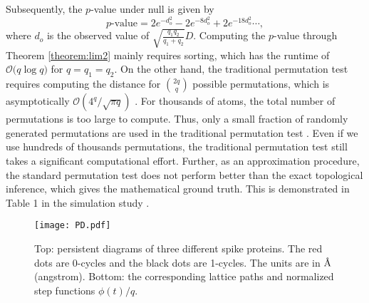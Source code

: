 \documentclass{llncs}
\begin{document}
Subsequently, the $p$-value under null is given by
$$\mbox{$p$-value} = 2 e^{-d_{o}^2} - 2e^{-8d_{o}^2} + 2 e^{-18d_{o}^2} \cdots,$$ where $d_{o}$ is the observed value of 
$\sqrt{\frac{q_1q_2}{q_1 + q_2}}D$.  
Computing the $p$-value through Theorem \ref{theorem:lim2} mainly requires sorting, which has the runtime of  $\mathcal{O} \big( q \log q \big)$ for $q=q_1=q_2$. On the other hand, the traditional permutation test requires computing the distance for ${2q \choose q}$ possible permutations, which is asymptotically  $\mathcal{O}(4^q /\sqrt{\pi q} )$ \cite{chung.2019.CNI,feller.2008}. For thousands of atoms, the total number of permutations is  too large to compute. Thus, only a small fraction of  randomly generated permutations are used in the traditional permutation test  \cite{chung.2017.IPMI,chung.2018.MICCAI,chung.2019.CNI,nichols.2002,thompson.2001,zalesky.2010}. Even if we use hundreds of thousands permutations, the traditional permutation test still takes a significant computational effort.
Further, as an approximation procedure, the standard  permutation test does not perform better than the exact topological inference, which gives the mathematical ground truth. This is demonstrated in Table 1 in the simulation study \cite{chung.2018.MICCAI}. 


 \begin{figure}[t]
\center
  \texttt{[image: PD.pdf]}
  \caption{\small Top: persistent diagrams of three different spike proteins. The red dots are 0-cycles and the black dots are 1-cycles. 
  The units are in $\text{\normalfont\AA}$ (angstrom). Bottom: the corresponding lattice paths and normalized step functions $\phi(t)/q$.}
  \label{fig:PD}
\end{figure}
\end{document}
